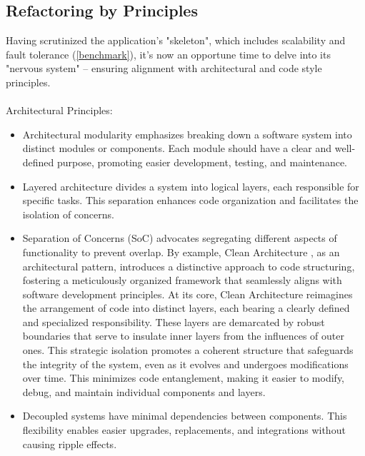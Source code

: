 
\subsection{Refactoring by Principles} \label{refactoring}

Having scrutinized the application's "skeleton", which includes scalability and fault tolerance (\ref{benchmark}), 
it's now an opportune time to delve into its "nervous system" -- ensuring alignment with architectural and code style 
principles.\\
\\

\noindent Architectural Principles:

\begin{itemize}
  \item Architectural modularity \cite{Rich20} emphasizes breaking down a software system into distinct modules or 
  components. Each module should have a clear and well-defined purpose, promoting easier development, testing, and 
  maintenance.

  \item Layered architecture \cite{Rich22} divides a system into logical layers, each responsible for specific tasks. 
  This separation enhances code organization and facilitates the isolation of concerns.

  \item Separation of Concerns (SoC) advocates segregating different aspects of functionality to prevent overlap. By 
  example, Clean Architecture \cite{Mart18}, as an architectural pattern, introduces a distinctive approach to code 
  structuring, fostering a meticulously organized framework that seamlessly aligns with software development principles. 
  At its core, Clean Architecture reimagines the arrangement of code into distinct layers, each bearing a clearly 
  defined and specialized responsibility. These layers are demarcated by robust boundaries that serve to insulate 
  inner layers from the influences of outer ones. This strategic isolation promotes a coherent structure that safeguards 
  the integrity of the system, even as it evolves and undergoes modifications over time. This minimizes code 
  entanglement, making it easier to modify, debug, and maintain individual components and layers.

  \item Decoupled systems \cite{Kass05} have minimal dependencies between components. This flexibility enables easier 
  upgrades, replacements, and integrations without causing ripple effects.
\end{itemize}

